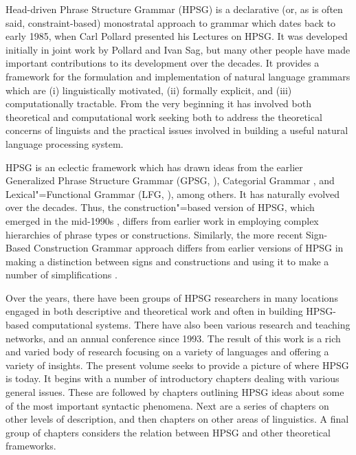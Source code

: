 \begin{refsection}

Head-driven Phrase Structure Grammar (HPSG) is a declarative (or, as is often said,
constraint-based) monostratal approach to grammar which dates back to early 1985, when Carl Pollard
presented his Lectures on HPSG. It was developed initially in joint work by Pollard and Ivan Sag,
but many other people have made important contributions to its development over the decades. It
provides a framework for the formulation and implementation of natural language grammars which are
(i) linguistically motivated, (ii) formally explicit, and (iii) computationally tractable. From the
very beginning it has involved both theoretical and computational work seeking both to address the
theoretical concerns of linguists and the practical issues involved in building a useful natural
language processing system.

HPSG is an eclectic framework which has drawn ideas from the earlier Generalized Phrase Structure
Grammar (GPSG, \citealp{GKPS85a}), Categorial Grammar \citep{Ajdukiewicz35a-u}, and Lexical"=Functional
Grammar (LFG, \citealp{Bresnan82a-ed}), among others. It has naturally evolved over the decades. Thus, the construction"=based version of
HPSG, which emerged in the mid-1990s \citep{Sag97a,GSag2000a-u}, differs from earlier work
\citep{ps,ps2} in employing complex hierarchies of phrase types or
constructions. Similarly, the more recent Sign-Based Construction Grammar approach differs from
earlier versions of HPSG in making a distinction between signs and constructions and using it to make a
number of simplifications \citep{Sag2012a}.

Over the years, there have been groups of HPSG researchers in many locations engaged in both
descriptive and theoretical work and often in building HPSG-based computational systems. There have
also been various research and teaching networks, and an annual conference since 1993. The result of
this work is a rich and varied body of research focusing on a variety of languages and offering a
variety of insights. The present volume seeks to provide a picture of where HPSG is today. It begins
with a number of introductory chapters dealing with various general issues. These are followed by
chapters outlining HPSG ideas about some of the most important syntactic phenomena. Next are a
series of chapters on other levels of description, and then chapters on other areas of
linguistics. A final group of chapters considers the relation between HPSG and other theoretical
frameworks.


\end{refsection}
